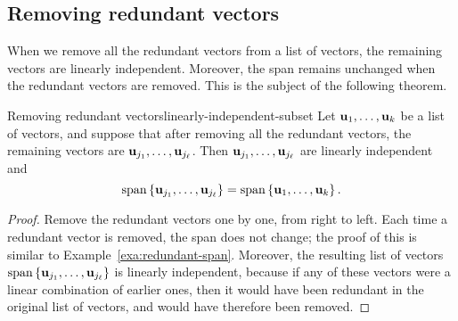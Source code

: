 \subsection{Removing redundant vectors}

When we remove all the redundant vectors from a list of vectors, the
remaining vectors are linearly independent. Moreover, the span remains
unchanged when the redundant vectors are removed. This is the subject
of the following theorem.

\begin{theorem}{Removing redundant vectors}{linearly-independent-subset}
  Let $\mbox{\bf u}_1,\ldots,\mbox{\bf u}_k$ be a list of vectors, and suppose
  that after removing all the redundant vectors, the remaining vectors
  are $\mbox{\bf u}_{j_1},\ldots,\mbox{\bf u}_{j_\ell}$. Then
  $\mbox{\bf u}_{j_1},\ldots,\mbox{\bf u}_{j_\ell}$ are linearly independent
  and
  \begin{equation*}
    \sspan\set{\vect{u}_{j_1},\ldots,\vect{u}_{j_\ell}}
    =
    \sspan\set{\vect{u}_1,\ldots,\vect{u}_k}.    
  \end{equation*}
\end{theorem}

\begin{proof}
  Remove the redundant vectors one by one, from right to left. Each
  time a redundant vector is removed, the span does not change; the
  proof of this is similar to Example~\ref{exa:redundant-span}.
  Moreover, the resulting list of vectors
  $\sspan\set{\vect{u}_{j_1},\ldots,\vect{u}_{j_\ell}}$ is linearly
  independent, because if any of these vectors were a linear
  combination of earlier ones, then it would have been redundant in
  the original list of vectors, and would have therefore been removed.
\end{proof}

